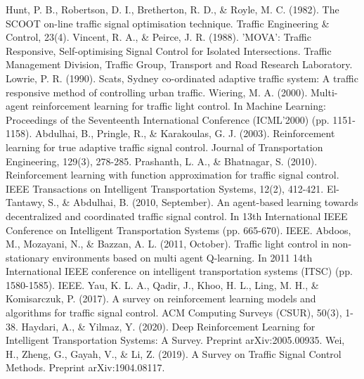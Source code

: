 \documentclass[a4paper, conference]{IEEEtran}
\begin{document}
%
%
%
 \vspace{-2mm}
\begin{thebibliography}{0}
 Hunt, P. B., Robertson, D. I., Bretherton, R. D., \& Royle, M. C. (1982). The SCOOT on-line traffic signal optimisation technique. Traffic Engineering \& Control, 23(4).
 Vincent, R. A., \& Peirce, J. R. (1988). 'MOVA': Traffic Responsive, Self-optimising Signal Control for Isolated Intersections. Traffic Management Division, Traffic Group, Transport and Road Research Laboratory.
 Lowrie, P. R. (1990). Scats, Sydney co-ordinated adaptive traffic system: A traffic responsive method of controlling urban traffic.
 Wiering, M. A. (2000). Multi-agent reinforcement learning for traffic light control. In Machine Learning: Proceedings of the Seventeenth International Conference (ICML'2000) (pp. 1151-1158).
 Abdulhai, B., Pringle, R., \& Karakoulas, G. J. (2003). Reinforcement learning for true adaptive traffic signal control. Journal of Transportation Engineering, 129(3), 278-285.
 Prashanth, L. A., \& Bhatnagar, S. (2010). Reinforcement learning with function approximation for traffic signal control. IEEE Transactions on Intelligent Transportation Systems, 12(2), 412-421.
 El-Tantawy, S., \& Abdulhai, B. (2010, September). An agent-based learning towards decentralized and coordinated traffic signal control. In 13th International IEEE Conference on Intelligent Transportation Systems (pp. 665-670). IEEE.
 Abdoos, M., Mozayani, N., \& Bazzan, A. L. (2011, October). Traffic light control in non-stationary environments based on multi agent Q-learning. In 2011 14th International IEEE conference on intelligent transportation systems (ITSC) (pp. 1580-1585). IEEE.
 Yau, K. L. A., Qadir, J., Khoo, H. L., Ling, M. H., \& Komisarczuk, P. (2017). A survey on reinforcement learning models and algorithms for traffic signal control. ACM Computing Surveys (CSUR), 50(3), 1-38.
 Haydari, A., \& Yilmaz, Y. (2020). Deep Reinforcement Learning for Intelligent Transportation Systems: A Survey. Preprint arXiv:2005.00935.
 Wei, H., Zheng, G., Gayah, V., \& Li, Z. (2019). A Survey on Traffic Signal Control Methods. Preprint arXiv:1904.08117.



\end{thebibliography}
\end{document}
